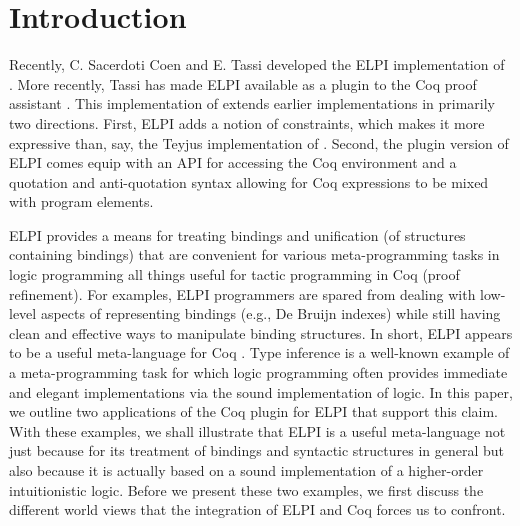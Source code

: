 \section{Introduction}
\label{sec:intro}

Recently, C. Sacerdoti Coen and E. Tassi developed the ELPI
implementation \cite{dunchev15lpar} of \lP \cite{miller12proghol}.
More recently, Tassi has made ELPI available as a plugin to the Coq
proof assistant \cite{tassi18coqpl}.  This implementation of \lP
extends earlier implementations in primarily two directions.  First,
ELPI adds a notion of constraints, which makes it more expressive than,
say, the Teyjus implementation of \lP \cite{nadathur99cade}.  Second,
the plugin version of ELPI comes equip with an API for accessing the
Coq environment and a quotation and anti-quotation syntax allowing for
Coq expressions to be mixed with \lP program elements.

ELPI provides a means for treating bindings and unification (of
structures containing bindings) that are convenient for various
meta-programming tasks in logic programming all things useful for
tactic programming in Coq (proof refinement).  For examples, ELPI
programmers are spared from dealing with low-level aspects of
representing bindings (e.g., De Bruijn indexes) while still having
clean and effective ways to manipulate binding structures.  In short,
ELPI appears to be a useful meta-language for Coq
\cite{coen19mscs,tassi18coqpl,tassi19itp}.  
Type inference is a well-known example of a meta-programming task for
which logic programming often provides immediate and elegant
implementations via the sound implementation of logic.  %
In this paper, we outline
two applications of the Coq plugin for ELPI that support this claim.
With these examples, we shall illustrate that ELPI is a useful
meta-language not just because for its treatment of bindings and
syntactic structures in general but also because it is actually based
on a sound implementation of a higher-order intuitionistic logic.
Before we present these two examples, we
first discuss the different world views that the integration of ELPI
and Coq forces us to confront.
